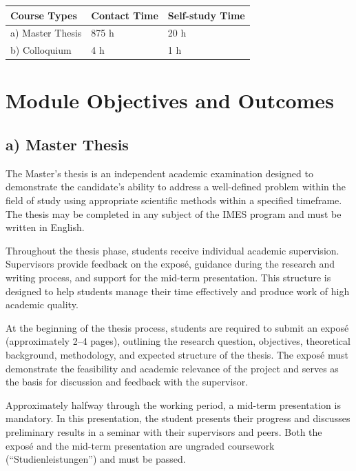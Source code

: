 \documentclass[
  letterpaper,
  10pt,
  openany]{book}
\begin{document}
\begin{longtable}[]{@{}lll@{}}
\toprule\noalign{}
Course Types & Contact Time & Self-study Time \\
\midrule\noalign{}
\endhead
\bottomrule\noalign{}
\endlastfoot
a) Master Thesis & 875 h & 20 h \\
b) Colloquium & 4 h & 1 h \\
\end{longtable}

\section*{Module Objectives and
Outcomes}\label{module-objectives-and-outcomes-1}


\subsection*{a) Master Thesis}\label{a-master-thesis}

The Master's thesis is an independent academic examination designed to
demonstrate the candidate's ability to address a well-defined problem
within the field of study using appropriate scientific methods within a
specified timeframe. The thesis may be completed in any subject of the
IMES program and must be written in English.

Throughout the thesis phase, students receive individual academic
supervision. Supervisors provide feedback on the exposé, guidance during
the research and writing process, and support for the mid-term
presentation. This structure is designed to help students manage their
time effectively and produce work of high academic quality.

At the beginning of the thesis process, students are required to submit
an exposé (approximately 2--4 pages), outlining the research question,
objectives, theoretical background, methodology, and expected structure
of the thesis. The exposé must demonstrate the feasibility and academic
relevance of the project and serves as the basis for discussion and
feedback with the supervisor.

Approximately halfway through the working period, a mid-term
presentation is mandatory. In this presentation, the student presents
their progress and discusses preliminary results in a seminar with their
supervisors and peers. Both the exposé and the mid-term presentation are
ungraded coursework (``Studienleistungen'') and must be passed.
\end{document}
